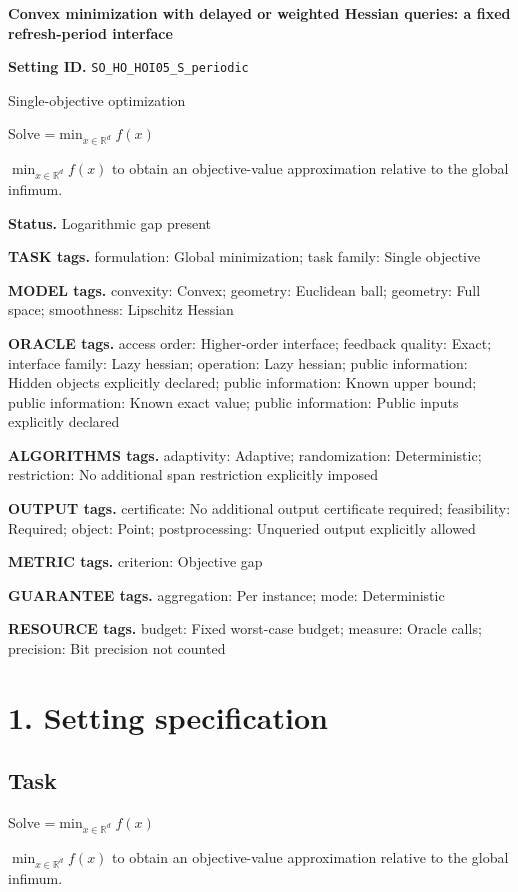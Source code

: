 \documentclass[10pt,a4paper]{article}
\newcommand{\AtlasMath}[1]{\par\begingroup\centering\setbox0=\hbox{$\displaystyle #1$}\ifdim\wd0>1.4\linewidth\typeout{ATLAS WIDE FORMULA: \the\wd0}\fi\ifdim\wd0>\linewidth\resizebox{\linewidth}{!}{\box0}\else\box0\fi\par\endgroup}
\newcommand{\AtlasInlineMath}[1]{\begingroup\setbox0=\hbox{$#1$}\ifdim\wd0>.4\linewidth\endgroup\AtlasMath{#1}\else\endgroup$#1$\fi}
\begin{document}
\raggedright

{\LARGE\bfseries\sffamily\color{AtlasNavy} Convex minimization with delayed or weighted Hessian queries: a fixed refresh-period interface\par}\vspace{5pt}
\textbf{Setting ID.} \texttt{SO\_\allowbreak{}HO\_\allowbreak{}HOI05\_\allowbreak{}S\_\allowbreak{}periodic}

Single-objective optimization

Solve \AtlasInlineMath{\min_{x\in \mathbb{R}^d}f(x)} to obtain an objective-value approximation relative to the global infimum.

\textbf{Status.} Logarithmic gap present

\textbf{TASK tags.} formulation: Global minimization; task family: Single objective

\textbf{MODEL tags.} convexity: Convex; geometry: Euclidean ball; geometry: Full space; smoothness: Lipschitz Hessian

\textbf{ORACLE tags.} access order: Higher-order interface; feedback quality: Exact; interface family: Lazy hessian; operation: Lazy hessian; public information: Hidden objects explicitly declared; public information: Known upper bound; public information: Known exact value; public information: Public inputs explicitly declared

\textbf{ALGORITHMS tags.} adaptivity: Adaptive; randomization: Deterministic; restriction: No additional span restriction explicitly imposed

\textbf{OUTPUT tags.} certificate: No additional output certificate required; feasibility: Required; object: Point; postprocessing: Unqueried output explicitly allowed

\textbf{METRIC tags.} criterion: Objective gap

\textbf{GUARANTEE tags.} aggregation: Per instance; mode: Deterministic

\textbf{RESOURCE tags.} budget: Fixed worst-case budget; measure: Oracle calls; precision: Bit precision not counted

\section{1. Setting specification}
\subsection{Task}
Solve \AtlasInlineMath{\min_{x\in \mathbb{R}^d}f(x)} to obtain an objective-value approximation relative to the global infimum.
\end{document}
